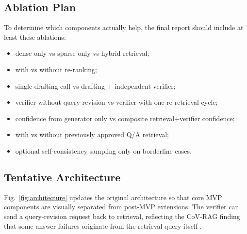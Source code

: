 \documentclass[11pt,journal,onecolumn]{IEEEtran}
\begin{document}
\subsection{Ablation Plan}
To determine which components actually help, the final report should include at least these ablations:
\begin{itemize}[leftmargin=1.7em]
    \item dense-only vs sparse-only vs hybrid retrieval;
    \item with vs without re-ranking;
    \item single drafting call vs drafting + independent verifier;
    \item verifier without query revision vs verifier with one re-retrieval cycle;
    \item confidence from generator only vs composite retrieval+verifier confidence;
    \item with vs without previously approved Q/A retrieval;
    \item optional self-consistency sampling only on borderline cases.
\end{itemize}

\subsection{Tentative Architecture}
Fig.~\ref{fig:architecture} updates the original architecture so that core MVP components are visually separated from post-MVP extensions. The verifier can send a query-revision request back to retrieval, reflecting the CoV-RAG finding that some answer failures originate from the retrieval query itself \cite{he2024covrag}.
\end{document}
